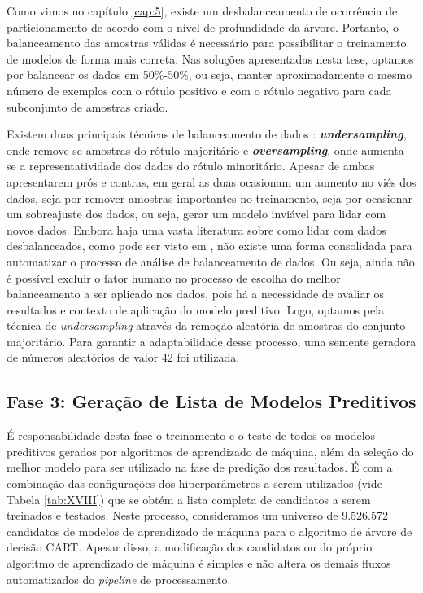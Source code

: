 Como vimos no capítulo \ref{cap:5}, existe um desbalanceamento de ocorrência de particionamento de acordo com o nível de profundidade da árvore. Portanto, o balanceamento das amostras válidas é necessário para possibilitar o treinamento de modelos de forma mais correta. Nas soluções apresentadas nesta tese, optamos por balancear os dados em 50\%-50\%, ou seja, manter aproximadamente o mesmo número de exemplos com o rótulo positivo e com o rótulo negativo para cada subconjunto de amostras criado.

Existem duas principais técnicas de balanceamento de dados \cite{bib:livroRaschka}: \textbf{\textit{undersampling}}, onde remove-se amostras do rótulo majoritário e \textbf{\textit{oversampling}}, onde aumenta-se a representatividade dos dados do rótulo minoritário. Apesar de ambas apresentarem prós e contras, em geral as duas ocasionam um aumento no viés dos dados, seja por remover amostras importantes no treinamento, seja por ocasionar um sobreajuste dos dados, ou seja, gerar um modelo inviável para lidar com novos dados. Embora haja uma vasta literatura sobre como lidar com dados desbalanceados, como pode ser visto em \citet{bib:livroimbalanced}, não existe uma forma consolidada para automatizar o processo de análise de balanceamento de dados. Ou seja, ainda não é possível excluir o fator humano no processo de escolha do melhor balanceamento a ser aplicado nos dados, pois há a necessidade de avaliar os resultados e contexto de aplicação do modelo preditivo. Logo, optamos pela técnica de \textit{undersampling} através da remoção aleatória de amostras do conjunto majoritário. Para garantir a adaptabilidade desse processo, uma semente geradora de números aleatórios de valor 42 foi utilizada. 

\subsection{Fase 3: Geração de Lista de Modelos Preditivos}
\label{cap:7.2.3}

É responsabilidade desta fase o treinamento e o teste de todos os modelos preditivos gerados por algoritmos de aprendizado de máquina, além da seleção do melhor modelo para ser utilizado na fase de predição dos resultados. É com a combinação das configurações dos hiperparâmetros a serem utilizados (vide Tabela \ref{tab:XVIII}) que se obtém a lista completa de candidatos a serem treinados e testados. Neste processo, consideramos um universo de 9.526.572 candidatos de modelos de aprendizado de máquina para o algoritmo de árvore de decisão CART. Apesar disso, a modificação dos candidatos ou do próprio algoritmo de aprendizado de máquina é simples e não altera os demais fluxos automatizados do \textit{pipeline} de processamento.

